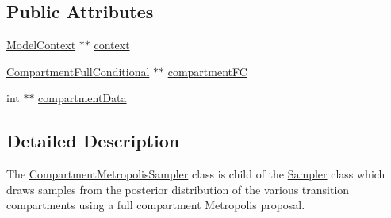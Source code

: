 \subsection*{Public Attributes}
\begin{DoxyCompactItemize}
\item 
\hyperlink{classSpatialSEIR_1_1ModelContext}{Model\-Context} $\ast$$\ast$ \hyperlink{classSpatialSEIR_1_1CompartmentMetropolisSampler_a17778f2c1b66d39a71a8fb6f5f648387}{context}
\item 
\hyperlink{classSpatialSEIR_1_1CompartmentFullConditional}{Compartment\-Full\-Conditional} $\ast$$\ast$ \hyperlink{classSpatialSEIR_1_1CompartmentMetropolisSampler_a917c4ed20e389f460e1cef15aeb51570}{compartment\-F\-C}
\item 
int $\ast$$\ast$ \hyperlink{classSpatialSEIR_1_1CompartmentMetropolisSampler_a82cb72e43365eddeec151023eca5af54}{compartment\-Data}
\end{DoxyCompactItemize}


\subsection{Detailed Description}
The \hyperlink{classSpatialSEIR_1_1CompartmentMetropolisSampler}{Compartment\-Metropolis\-Sampler} class is child of the \hyperlink{classSpatialSEIR_1_1Sampler}{Sampler} class which draws samples from the posterior distribution of the various transition compartments using a full compartment Metropolis proposal. 

